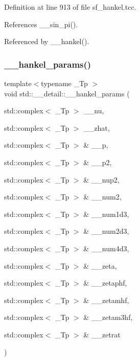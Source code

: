 Definition at line 913 of file sf\+\_\+hankel.\+tcc.



References \+\_\+\+\_\+sin\+\_\+pi().



Referenced by \+\_\+\+\_\+hankel().

\mbox{\label{namespacestd_1_1____detail_aff42671a79cd3852a57752f79c82f8da}} 
\subsubsection{\texorpdfstring{\+\_\+\+\_\+hankel\+\_\+params()}{\_\_hankel\_params()}}
{\footnotesize\ttfamily template$<$typename \+\_\+\+Tp $>$ \\
void std\+::\+\_\+\+\_\+detail\+::\+\_\+\+\_\+hankel\+\_\+params (\begin{DoxyParamCaption}\item[{std\+::complex$<$ \+\_\+\+Tp $>$}]{\+\_\+\+\_\+nu,  }\item[{std\+::complex$<$ \+\_\+\+Tp $>$}]{\+\_\+\+\_\+zhat,  }\item[{std\+::complex$<$ \+\_\+\+Tp $>$ \&}]{\+\_\+\+\_\+p,  }\item[{std\+::complex$<$ \+\_\+\+Tp $>$ \&}]{\+\_\+\+\_\+p2,  }\item[{std\+::complex$<$ \+\_\+\+Tp $>$ \&}]{\+\_\+\+\_\+nup2,  }\item[{std\+::complex$<$ \+\_\+\+Tp $>$ \&}]{\+\_\+\+\_\+num2,  }\item[{std\+::complex$<$ \+\_\+\+Tp $>$ \&}]{\+\_\+\+\_\+num1d3,  }\item[{std\+::complex$<$ \+\_\+\+Tp $>$ \&}]{\+\_\+\+\_\+num2d3,  }\item[{std\+::complex$<$ \+\_\+\+Tp $>$ \&}]{\+\_\+\+\_\+num4d3,  }\item[{std\+::complex$<$ \+\_\+\+Tp $>$ \&}]{\+\_\+\+\_\+zeta,  }\item[{std\+::complex$<$ \+\_\+\+Tp $>$ \&}]{\+\_\+\+\_\+zetaphf,  }\item[{std\+::complex$<$ \+\_\+\+Tp $>$ \&}]{\+\_\+\+\_\+zetamhf,  }\item[{std\+::complex$<$ \+\_\+\+Tp $>$ \&}]{\+\_\+\+\_\+zetam3hf,  }\item[{std\+::complex$<$ \+\_\+\+Tp $>$ \&}]{\+\_\+\+\_\+zetrat }\end{DoxyParamCaption})}



